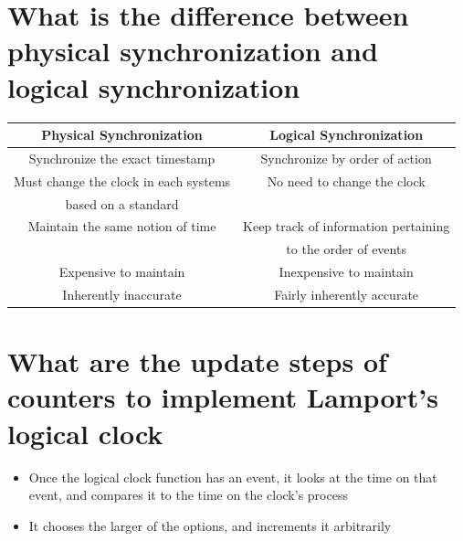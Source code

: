 \documentclass[11pt,a4paper]{report}
\begin{document}
\section{What is the difference between physical synchronization and logical synchronization}
\begin{tabular}{|c|c|}
\hline 
Physical Synchronization & Logical Synchronization \\ 
\hline 
Synchronize the exact timestamp & Synchronize by order of action \\ 
\hline 
Must change the clock in each systems & No need to change the clock \\  based on a standard &\\
\hline 
Maintain the same notion of time & Keep track of information pertaining \\ & to the order of events \\ 
\hline 
Expensive to maintain & Inexpensive to maintain \\ 
\hline 
Inherently inaccurate & Fairly inherently accurate \\ 
\hline 
\end{tabular}

\section{What are the update steps of counters to implement Lamport’s logical clock}
\begin{itemize}
	\item Once the logical clock function has an event, it looks at the time on that event, and compares it to the time on the clock’s process
	\item It chooses the larger of the options, and increments it arbitrarily
\end{itemize}
\end{document}
